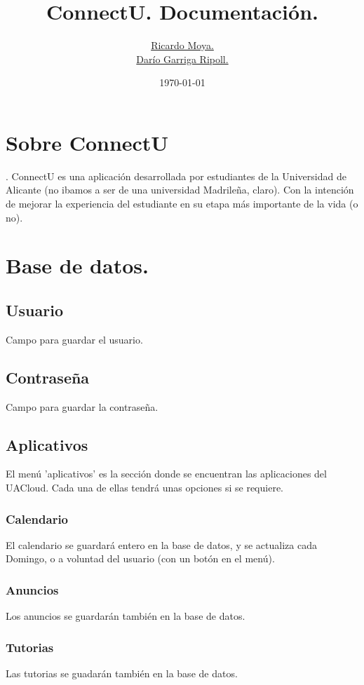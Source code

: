 \documentclass[12pt]{article}
\begin{document}
  \title{ConnectU. Documentaci\'{o}n.}
  \author{
    \href{https://github.com/Onelio}{Ricardo Moya.}\\
    \href{https://github.com/dgrr}{Dar\'{i}o Garriga Ripoll.}
  }
  \date{\today}
  \maketitle
  \tableofcontents
  \newpage

  \section{Sobre ConnectU}.
    ConnectU es una aplicaci\'{o}n desarrollada por estudiantes de la Universidad de Alicante
    (no ibamos a ser de una universidad Madrile\~{n}a, claro). Con la intenci\'{o}n de
    mejorar la experiencia del estudiante en su etapa m\'{a}s importante de la vida
    (o no).
  \section{Base de datos.}
    \subsection{Usuario}
      Campo para guardar el usuario.
    \subsection{Contrase\~{n}a}
      Campo para guardar la contrase\~{n}a.
    \subsection{Aplicativos}
      El men\'{u} 'aplicativos' es la secci\'{o}n donde se encuentran las aplicaciones
      del UACloud. Cada una de ellas tendr\'{a} unas opciones si se requiere.
      \subsubsection{Calendario}
        El calendario se guardar\'{a} entero en la base de datos, y se actualiza cada Domingo,
        o a voluntad del usuario (con un bot\'{o}n en el men\'{u}).
      \subsubsection{Anuncios}
        Los anuncios se guardar\'{a}n tambi\'{e}n en la base de datos.
      \subsubsection{Tutorias}
        Las tutorias se guadar\'{a}n tambi\'{e}n en la base de datos.
\end{document}
